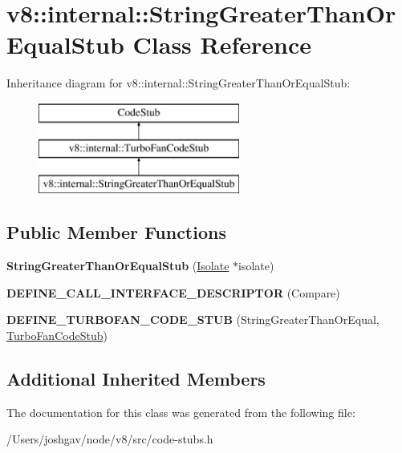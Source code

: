 \hypertarget{classv8_1_1internal_1_1_string_greater_than_or_equal_stub}{}\section{v8\+:\+:internal\+:\+:String\+Greater\+Than\+Or\+Equal\+Stub Class Reference}
\label{classv8_1_1internal_1_1_string_greater_than_or_equal_stub}
Inheritance diagram for v8\+:\+:internal\+:\+:String\+Greater\+Than\+Or\+Equal\+Stub\+:\begin{figure}[H]
\begin{center}
\leavevmode
\includegraphics[height=3.000000cm]{classv8_1_1internal_1_1_string_greater_than_or_equal_stub}
\end{center}
\end{figure}
\subsection*{Public Member Functions}
\begin{DoxyCompactItemize}
\item 
{\bfseries String\+Greater\+Than\+Or\+Equal\+Stub} (\hyperlink{classv8_1_1internal_1_1_isolate}{Isolate} $\ast$isolate)\hypertarget{classv8_1_1internal_1_1_string_greater_than_or_equal_stub_ab00f28d57ef33d4fc1352d6a39f9ec53}{}\label{classv8_1_1internal_1_1_string_greater_than_or_equal_stub_ab00f28d57ef33d4fc1352d6a39f9ec53}

\item 
{\bfseries D\+E\+F\+I\+N\+E\+\_\+\+C\+A\+L\+L\+\_\+\+I\+N\+T\+E\+R\+F\+A\+C\+E\+\_\+\+D\+E\+S\+C\+R\+I\+P\+T\+OR} (Compare)\hypertarget{classv8_1_1internal_1_1_string_greater_than_or_equal_stub_ae853e7d7166738ede80200a4538a3913}{}\label{classv8_1_1internal_1_1_string_greater_than_or_equal_stub_ae853e7d7166738ede80200a4538a3913}

\item 
{\bfseries D\+E\+F\+I\+N\+E\+\_\+\+T\+U\+R\+B\+O\+F\+A\+N\+\_\+\+C\+O\+D\+E\+\_\+\+S\+T\+UB} (String\+Greater\+Than\+Or\+Equal, \hyperlink{classv8_1_1internal_1_1_turbo_fan_code_stub}{Turbo\+Fan\+Code\+Stub})\hypertarget{classv8_1_1internal_1_1_string_greater_than_or_equal_stub_aab4c2ee5e1939cb43288a4a503c0f3c8}{}\label{classv8_1_1internal_1_1_string_greater_than_or_equal_stub_aab4c2ee5e1939cb43288a4a503c0f3c8}

\end{DoxyCompactItemize}
\subsection*{Additional Inherited Members}


The documentation for this class was generated from the following file\+:\begin{DoxyCompactItemize}
\item 
/\+Users/joshgav/node/v8/src/code-\/stubs.\+h\end{DoxyCompactItemize}
